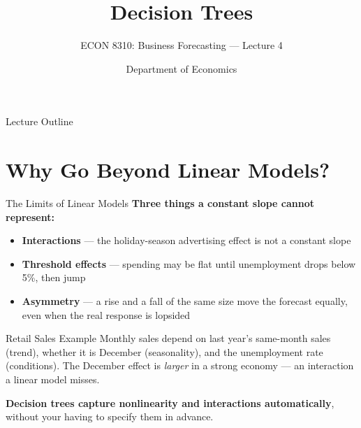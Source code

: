 \documentclass[aspectratio=169, 11pt]{beamer}
\title[Decision Trees]{Decision Trees}
\subtitle{ECON 8310: Business Forecasting --- Lecture 4}
\author{Department of Economics}
\institute{University of Nebraska at Omaha}
\begin{document}

\begin{frame}
  \titlepage
\end{frame}

\begin{frame}{Lecture Outline}
  \tableofcontents
\end{frame}

\section{Why Go Beyond Linear Models?}


\begin{frame}{The Limits of Linear Models}
  \textbf{Three things a constant slope cannot represent:}
  \begin{itemize}
    \item \textbf{Interactions} --- the holiday-season advertising effect
          is not a constant slope
    \item \textbf{Threshold effects} --- spending may be flat until
          unemployment drops below 5\%, then jump
    \item \textbf{Asymmetry} --- a rise and a fall of the same size move the
          forecast equally, even when the real response is lopsided
  \end{itemize}
  \begin{examplebox}{Retail Sales Example}
    Monthly sales depend on last year's same-month sales (trend),
    whether it is December (seasonality), and the unemployment rate
    (conditions). The December effect is \emph{larger} in a strong
    economy --- an interaction a linear model misses.
  \end{examplebox}
  \textbf{Decision trees capture nonlinearity and interactions automatically},
  without your having to specify them in advance.
\end{frame}
\end{document}
